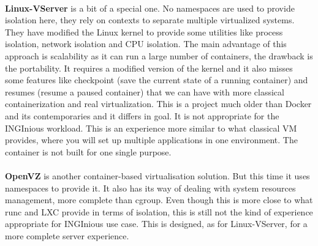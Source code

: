 \paragraph{}\textbf{Linux-VServer}\cite{linux-vserver} is a bit of a special one.  No namespaces are used to provide isolation here, they rely on contexts to separate multiple virtualized systems.  They have modified the Linux kernel to provide some utilities like process isolation, network isolation and CPU isolation.  The main advantage of this approach is scalability as it can run a large number of containers, the drawback is the portability.  It requires a modified version of the kernel and it also misses some features like checkpoint (save the current state of a running container) and resumes (resume a paused container) that we can have with more classical containerization and real virtualization.  This is a project much older than Docker and its contemporaries and it differs in goal.  It is not appropriate for the INGInious workload.  This is an experience more similar to what classical VM provides, where you will set up multiple applications in one environment.  The container is not built for one single purpose.

\paragraph{}\textbf{OpenVZ}\cite{openvz} is another container-based virtualisation solution.  But this time it uses namespaces to provide it.  It also has its way of dealing with system resources management, more complete than cgroup.  Even though this is more close to what runc and LXC provide in terms of isolation, this is still not the kind of experience appropriate for INGInious use case.  This is designed, as for Linux-VServer, for a more complete server experience.

